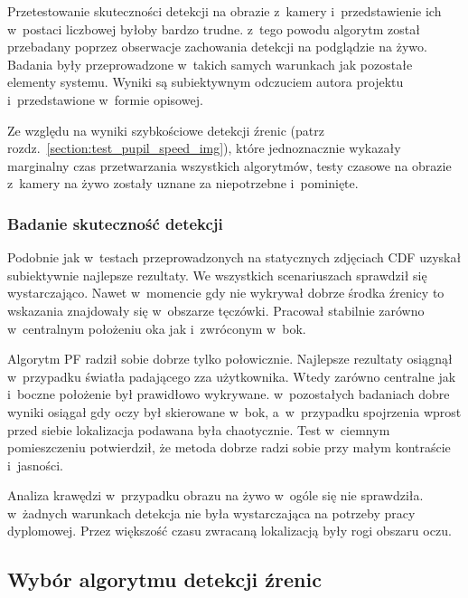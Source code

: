 Przetestowanie skuteczności detekcji na obrazie z~kamery i~przedstawienie ich w~postaci liczbowej byłoby bardzo trudne. z~tego powodu algorytm został przebadany poprzez obserwacje zachowania detekcji na podglądzie na żywo. Badania były przeprowadzone w~takich samych warunkach jak pozostałe elementy systemu. Wyniki są subiektywnym odczuciem autora projektu i~przedstawione w~formie opisowej. 

\par

Ze względu na wyniki szybkościowe detekcji źrenic (patrz rozdz.~\ref{section:test_pupil_speed_img}), które jednoznacznie wykazały marginalny czas przetwarzania wszystkich algorytmów, testy czasowe na obrazie z~kamery na żywo zostały uznane za niepotrzebne i~pominięte.

\subsubsection{Badanie skuteczność detekcji}

Podobnie jak w~testach przeprowadzonych na statycznych zdjęciach CDF uzyskał subiektywnie najlepsze rezultaty. We wszystkich scenariuszach sprawdził się wystarczająco. Nawet w~momencie gdy nie wykrywał dobrze środka źrenicy to wskazania znajdowały się w~obszarze tęczówki. Pracował stabilnie zarówno w~centralnym położeniu oka jak i~zwróconym w~bok. 

\par 

Algorytm PF radził sobie dobrze tylko połowicznie. Najlepsze rezultaty osiągnął w~przypadku światła padającego zza użytkownika. Wtedy zarówno centralne jak i~boczne położenie był prawidłowo wykrywane. w~pozostałych badaniach dobre wyniki osiągał gdy oczy był skierowane w~bok, a~w~przypadku spojrzenia wprost przed siebie lokalizacja podawana była chaotycznie. Test w~ciemnym pomieszczeniu potwierdził, że metoda dobrze radzi sobie przy małym kontraście i~jasności. 

\par

Analiza krawędzi w~przypadku obrazu na żywo w~ogóle się nie sprawdziła. w~żadnych warunkach detekcja nie była wystarczająca na potrzeby pracy dyplomowej. Przez większość czasu zwracaną lokalizacją były rogi obszaru oczu.


 

\subsection{Wybór algorytmu detekcji źrenic}

